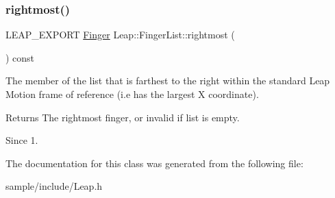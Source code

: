 \subsubsection{\texorpdfstring{rightmost()}{rightmost()}}
{\footnotesize\ttfamily L\+E\+A\+P\+\_\+\+E\+X\+P\+O\+RT \hyperlink{class_leap_1_1_finger}{Finger} Leap\+::\+Finger\+List\+::rightmost (\begin{DoxyParamCaption}{ }\end{DoxyParamCaption}) const}

The member of the list that is farthest to the right within the standard Leap Motion frame of reference (i.\+e has the largest X coordinate).


\begin{DoxyCodeInclude}
\end{DoxyCodeInclude}


\begin{DoxyReturn}{Returns}
The rightmost finger, or invalid if list is empty. 
\end{DoxyReturn}
\begin{DoxySince}{Since}
1. 
\end{DoxySince}


The documentation for this class was generated from the following file\+:\begin{DoxyCompactItemize}
\item 
sample/include/Leap.\+h\end{DoxyCompactItemize}

